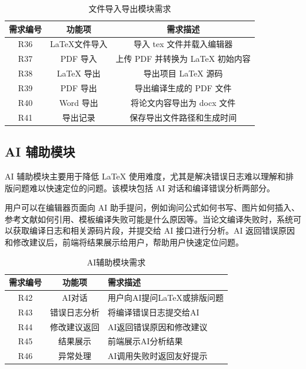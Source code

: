 \documentclass{xduugthesis}
\begin{document}
\begin{table}[!ht]
    \centering
    \caption{文件导入导出模块需求}
    \label{tab:file-import-export-requirement}
    \begin{tabular}{|c|c|c|}
        \hline
        需求编号 & 功能项 & 需求描述 \\
        \hline
        R36 & LaTeX文件导入 & 导入 tex 文件并载入编辑器 \\
        \hline
        R37 & PDF 导入 & 上传 PDF 并转换为 LaTeX 初始内容 \\
        \hline
        R38 & LaTeX 导出 & 导出项目 LaTeX 源码 \\
        \hline
        R39 & PDF 导出 & 导出编译生成的 PDF 文件 \\
        \hline
        R40 & Word 导出 & 将论文内容导出为 docx 文件 \\
        \hline
        R41 & 导出记录 & 保存导出文件路径和生成时间 \\
        \hline
    \end{tabular}
\end{table}

\subsection{AI 辅助模块}
AI 辅助模块主要用于降低 LaTeX 使用难度，尤其是解决错误日志难以理解和排版问题难以快速定位的问题。该模块包括 AI 对话和编译错误分析两部分。

用户可以在编辑器页面向 AI 助手提问，例如询问公式如何书写、图片如何插入、参考文献如何引用、模板编译失败可能是什么原因等。当论文编译失败时，系统可以获取编译日志和相关源码片段，并提交给 AI 接口进行分析。AI 返回错误原因和修改建议后，前端将结果展示给用户，帮助用户快速定位问题。

\begin{table}[!ht]
    \centering
    \caption{AI辅助模块需求}
    \label{tab:ai-requirement}
    \begin{tabular}{|c|c|p{7cm}|}
        \hline
        需求编号 & 功能项 & 需求描述 \\
        \hline
        R42 & AI对话 & 用户向AI提问LaTeX或排版问题 \\
        \hline
        R43 & 错误日志分析 & 将编译错误日志提交给AI \\
        \hline
        R44 & 修改建议返回 & AI返回错误原因和修改建议 \\
        \hline
        R45 & 结果展示 & 前端展示AI分析结果 \\
        \hline
        R46 & 异常处理 & AI调用失败时返回友好提示 \\
        \hline
    \end{tabular}
\end{table}
\end{document}
